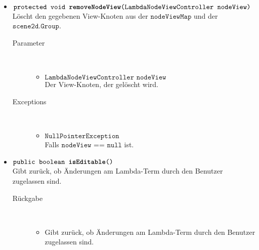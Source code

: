 \begin{description}
\begin{itemize}
		\item $\texttt{protected void \textbf{removeNodeView}(LambdaNodeViewController nodeView)}$ \\ Löscht den gegebenen View-Knoten aus der $\texttt{nodeViewMap}$ und der $\texttt{scene2d.Group}$.
		\begin{description}
			\item[Parameter] \hfill \\
			\vspace{-.8cm}
			\begin{itemize}
				\item $\texttt{LambdaNodeViewController nodeView}$ \\ Der View-Knoten, der gelöscht wird.
			\end{itemize}
			\item[Exceptions] \hfill \\
			\vspace{-.8cm}
			\begin{itemize}
				\item $\texttt{NullPointerException}$ \\ Falls $\texttt{nodeView == null}$ ist.
			\end{itemize}
		\end{description}
		
		\item $\texttt{public boolean \textbf{isEditable}()}$ \\ Gibt zurück, ob Änderungen am Lambda-Term durch den Benutzer zugelassen sind.
		\begin{description}
			\item[Rückgabe] \hfill \\
			\vspace{-.8cm}
			\begin{itemize}
				\item Gibt zurück, ob Änderungen am Lambda-Term durch den Benutzer zugelassen sind.
			\end{itemize}
		\end{description}
		

\end{itemize}
\end{description}
